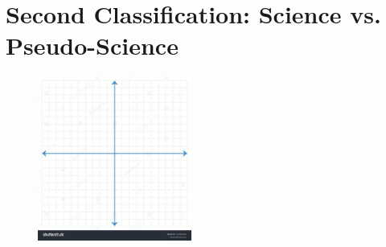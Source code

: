 \documentclass[12pt]{article}
\begin{document}
\clearpage

\section{Second Classification: Science vs. Pseudo-Science}

\begin{figure}[hb]
\centering
\includegraphics[width=0.45\textwidth,trim=0cm 3.5cm 0cm 0cm,clip=true]{figures/graph.jpg}
\caption{\label{fig:2}}
\end{figure}
\end{document}
